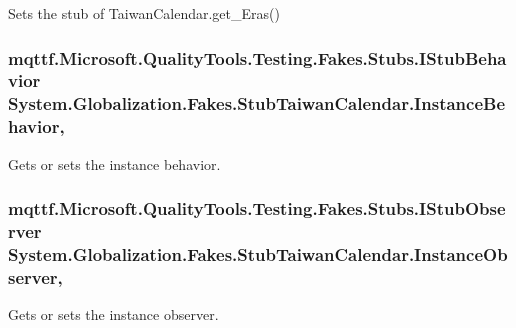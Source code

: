 Sets the stub of Taiwan\-Calendar.\-get\-\_\-\-Eras()

\hypertarget{class_system_1_1_globalization_1_1_fakes_1_1_stub_taiwan_calendar_ace027efdacf5b08a459f7ba1d9cdc2ee}{
\subsubsection[{Instance\-Behavior}]{\setlength{\rightskip}{0pt plus 5cm}mqttf.\-Microsoft.\-Quality\-Tools.\-Testing.\-Fakes.\-Stubs.\-I\-Stub\-Behavior System.\-Globalization.\-Fakes.\-Stub\-Taiwan\-Calendar.\-Instance\-Behavior\hspace{0.3cm}{\ttfamily [get]}, {\ttfamily [set]}}}\label{class_system_1_1_globalization_1_1_fakes_1_1_stub_taiwan_calendar_ace027efdacf5b08a459f7ba1d9cdc2ee}


Gets or sets the instance behavior.

\hypertarget{class_system_1_1_globalization_1_1_fakes_1_1_stub_taiwan_calendar_abd1d30bef300d0711410825bee131198}{
\subsubsection[{Instance\-Observer}]{\setlength{\rightskip}{0pt plus 5cm}mqttf.\-Microsoft.\-Quality\-Tools.\-Testing.\-Fakes.\-Stubs.\-I\-Stub\-Observer System.\-Globalization.\-Fakes.\-Stub\-Taiwan\-Calendar.\-Instance\-Observer\hspace{0.3cm}{\ttfamily [get]}, {\ttfamily [set]}}}\label{class_system_1_1_globalization_1_1_fakes_1_1_stub_taiwan_calendar_abd1d30bef300d0711410825bee131198}


Gets or sets the instance observer.

